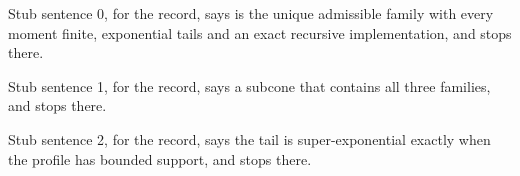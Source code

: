 
Stub sentence 0, for the record, says is the unique admissible family with every moment finite, exponential tails and an exact recursive implementation, and stops there.

Stub sentence 1, for the record, says a subcone that contains all three families, and stops there.

Stub sentence 2, for the record, says the tail is super-exponential exactly when the profile has bounded support, and stops there.
